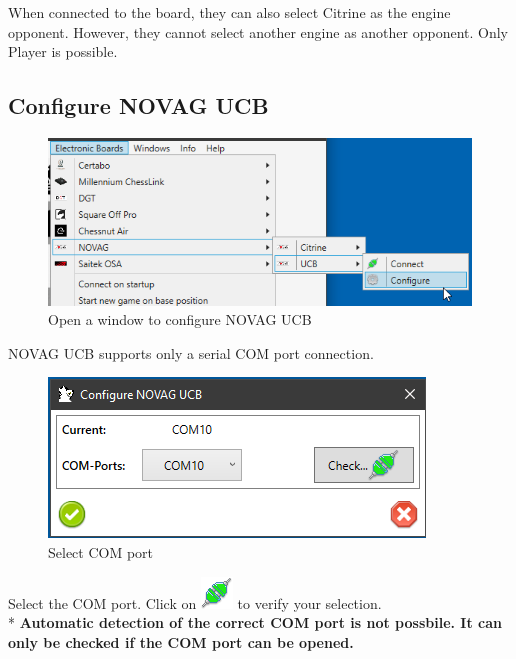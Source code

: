 \documentclass[11pt,a4paper]{article}
\begin{document}
When connected to the board, they can also select Citrine as the engine opponent.
However, they cannot select another engine as another opponent. Only Player is possible.

\subsection{Configure NOVAG UCB} \label{ConfigureNovagUCB}

\begin{figure}[H]
	\centering
	\includegraphics[scale=0.8]{NovagUCB1.png}
	\caption{Open a window to configure NOVAG UCB}
	\label{fig:NovagUCB1}
\end{figure}

NOVAG UCB supports only a serial COM port connection.

\begin{figure}[H]
	\centering
	\includegraphics[scale=1.0]{NovagUCB2.png}
	\caption{Select COM port}
	\label{fig:NovagUCB2}
\end{figure}

Select the COM port. Click on \includegraphics[scale=0.5]{connect.png} to verify your selection.\\
{\color{red}*} \textbf{Automatic detection of the correct COM port is not possbile. It can only be checked if the COM port can be opened.}
\end{document}
